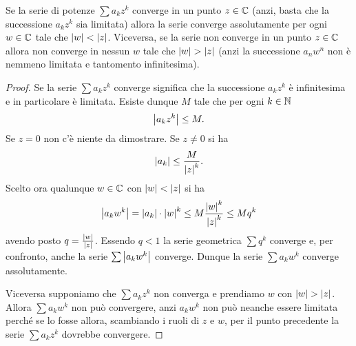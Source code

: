 \begin{theorem}
\mymark{***}
Se la serie di potenze $\sum a_k z^k$ converge in un punto $z\in {\mathbb C}$
(anzi, basta che la successione $a_k z^k$ sia limitata)
allora la serie
converge assolutamente per ogni $w\in {\mathbb C}$ tale che ${\left|w\right|}< {\left|z\right|}$.
Viceversa, se la serie non converge in un punto $z\in {\mathbb C}$
allora
non  converge in nessun $w$ tale che ${\left|w\right|} > {\left|z\right|}$ (anzi la successione
$a_n w^n$ non è nemmeno limitata e tantomento infinitesima).
\end{theorem}
%
\begin{proof}
\mymark{*}
Se la serie $\sum a_k z^k$ converge significa che la successione
$a_k z^k$ è infinitesima e in particolare è limitata.
Esiste dunque $M$ tale che per ogni $k\in {\mathbb N}$
\[
 {\left|a_k z^k\right|} \le M.
\]
Se $z=0$ non c'è niente da dimostrare.
Se $z\neq 0$ si ha
\[
 {\left|a_k\right|} \le \frac{M}{{\left|z\right|}^k}.
\]
Scelto ora qualunque $w\in {\mathbb C}$ con ${\left|w\right|} < {\left|z\right|}$ si ha
\[
  {\left|a_k w^k\right|} = {\left|a_k\right|}\cdot {\left|w\right|}^k \le M \frac{{\left|w\right|}^k}{{\left|z\right|}^k}
  \le M q^k
\]
avendo posto $q = \frac{{\left|w\right|}}{{\left|z\right|}}$.
Essendo $q<1$ la serie geometrica $\sum q^k$ converge e, per confronto,
anche la serie $\sum {\left|a_k w^k\right|}$ converge.
Dunque la serie $\sum a_k w^k$ converge assolutamente.

Viceversa supponiamo che $\sum a_k z^k$ non converga
e prendiamo $w$ con ${\left|w\right|} > {\left|z\right|}$.
Allora $\sum a_k w^k$ non può convergere,
anzi $a_k w^k$ non può neanche essere limitata perché
se lo fosse allora, scambiando i ruoli di $z$ e $w$,
per il punto precedente la serie $\sum a_k z^k$ dovrebbe convergere.
\end{proof}

